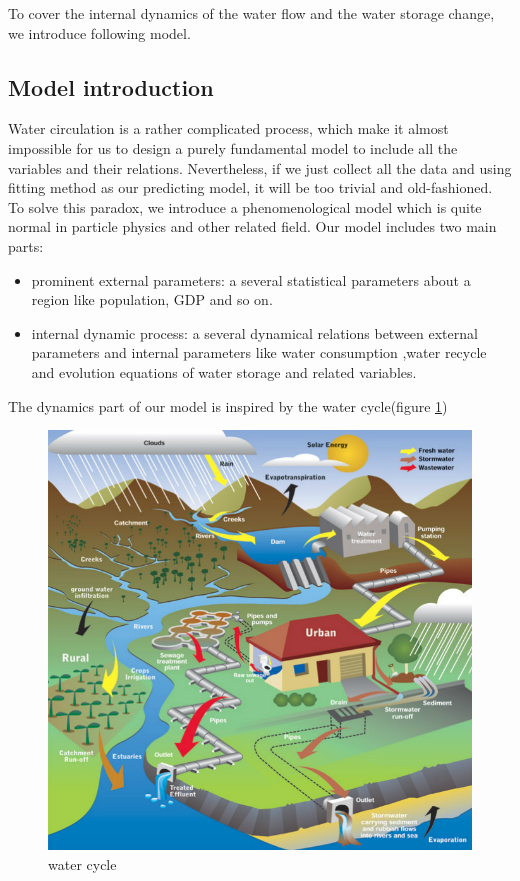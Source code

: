 To cover the internal dynamics of the water flow and the water storage change, we introduce following model.

  \subsection{Model introduction}
    Water circulation is a rather complicated process, which make it almost impossible for us to design a purely fundamental model to include all the variables and their relations. Nevertheless, if we just collect all the data and using fitting method as our predicting model, it will be too trivial and old-fashioned. To solve this paradox, we introduce a phenomenological model which is quite normal in particle physics and other related field. Our model includes two main parts:
    \begin{itemize}
      \item prominent external parameters: a several statistical parameters about a region like population, GDP and so on.
      \item internal dynamic process: a several dynamical relations between external parameters and internal parameters like water consumption ,water recycle and evolution equations of water storage and related variables.
    \end{itemize}


    The dynamics part of our model is inspired by the water cycle(figure \ref{water cycle})\cite{WaterCycle}
    \begin{figure}[!h]
    \begin{center}
    \includegraphics[width = 12cm]{picture/UrbanWaterCycle.jpg}
    \caption{water cycle}
    \label{water cycle}
    \end{center}
    \end{figure}




